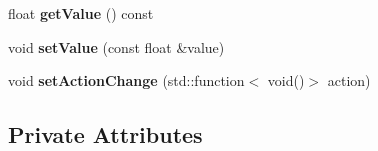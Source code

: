 \begin{DoxyCompactItemize}
\mbox{\label{classflounder_1_1inputslider_abfd79f6365d5498605040c4bf67939d6}} 
float {\bfseries get\+Value} () const
\item 
\mbox{\label{classflounder_1_1inputslider_a497557845fb46a5ff25fa6530a29eb8d}} 
void {\bfseries set\+Value} (const float \&value)
\item 
\mbox{\label{classflounder_1_1inputslider_a43b9cac2fa3624ed7d164910bf426be1}} 
void {\bfseries set\+Action\+Change} (std\+::function$<$ void()$>$ action)
\end{DoxyCompactItemize}
\subsection*{Private Attributes}
